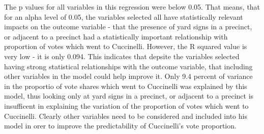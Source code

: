 \documentclass[12pt,letterpaper]{article}
\begin{document}
\begin{enumerate}
		\text The p values for all variables in this regression were below 0.05.  That means, that for an alpha level of 0.05, the variables selected all have statistically relevant impacts on the outcome variable - that the presence of yard signs in a precinct, or adjacent to a precinct had a statistically important relationship with proportion of votes which went to Cuccinelli. However, the R squared value is very low - it is only 0.094.  This indicates that depsite the variables selected having strong statistical relationships with the outcome variable, that including other variables in the model could help improve it.  Only 9.4 percent of variance in the proportio of vote shares which went to Cuccinelli was explained by this model, thus looking only at yard signs in a precinct, or adjacent to a precinct is insufficent in explaining the variation of the proportion of votes which went to Cuccinelli.  Clearly other variables need to be considered and included into his model in orer to improve the predictability of Cuccinelli's vote proportion.
	\end{enumerate}  
	
	
\end{document}
